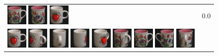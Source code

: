 \begin{figure}[tbp]
\begin{center}
\begin{tabular}{m{11cm} | m{3cm} |}
\includegraphics[width=1cm]{coil/beeld-6.eps} 
\includegraphics[width=1cm]{coil/beeld-8.eps} 
\includegraphics[width=1cm]{coil/beeld-36.eps} & {\scriptsize 0.0} \\ 
\includegraphics[width=1cm]{coil/beeld-36.eps} 
\includegraphics[width=1cm]{coil/beeld-40.eps} 
\includegraphics[width=1cm]{coil/beeld-41.eps} 
\includegraphics[width=1cm]{coil/beeld-38.eps} 
\includegraphics[width=1cm]{coil/beeld-39.eps} 
\includegraphics[width=1cm]{coil/beeld-10.eps} 
\includegraphics[width=1cm]{coil/beeld-6.eps} 
\includegraphics[width=1cm]{coil/beeld-7.eps} 
\includegraphics[width=1cm]{coil/beeld-11.eps} 

\end{tabular}
\end{center}
\end{figure}
